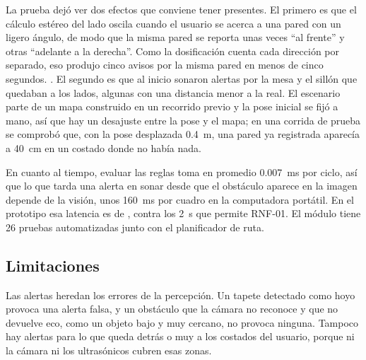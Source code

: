 La prueba dejó ver dos efectos que conviene tener presentes. El primero es que el
cálculo estéreo del lado oscila cuando el usuario se acerca a una pared con un ligero
ángulo, de modo que la misma pared se reporta unas veces ``al frente'' y otras
``adelante a la derecha''. Como la dosificación cuenta cada dirección por separado, eso
produjo cinco avisos por la misma pared en menos de cinco segundos. . El segundo es que al inicio sonaron alertas por la mesa y el sillón que
quedaban a los lados, algunas con una distancia menor a la real. El escenario parte de un
mapa construido en un recorrido previo y la pose inicial se fijó a mano, así que hay un
desajuste entre la pose y el mapa; en una corrida de prueba se comprobó que, con la pose
desplazada 0.4~m, una pared ya registrada aparecía a 40~cm en un costado donde no había
nada.

En cuanto al tiempo, evaluar las reglas toma en promedio 0.007~ms por ciclo, así que lo
que tarda una alerta en sonar desde que el obstáculo aparece en la imagen depende de la
visión, unos 160~ms por cuadro en la computadora portátil. En el prototipo esa latencia
es de , contra los 2~s que permite
RNF-01. El módulo tiene 26 pruebas automatizadas junto con el planificador de ruta.

\subsection{Limitaciones}

Las alertas heredan los errores de la percepción. Un tapete detectado como hoyo provoca
una alerta falsa, y un obstáculo que la cámara no reconoce y que no devuelve eco, como
un objeto bajo y muy cercano, no provoca ninguna. Tampoco hay alertas para lo que queda
detrás o muy a los costados del usuario, porque ni la cámara ni los ultrasónicos cubren
esas zonas.
